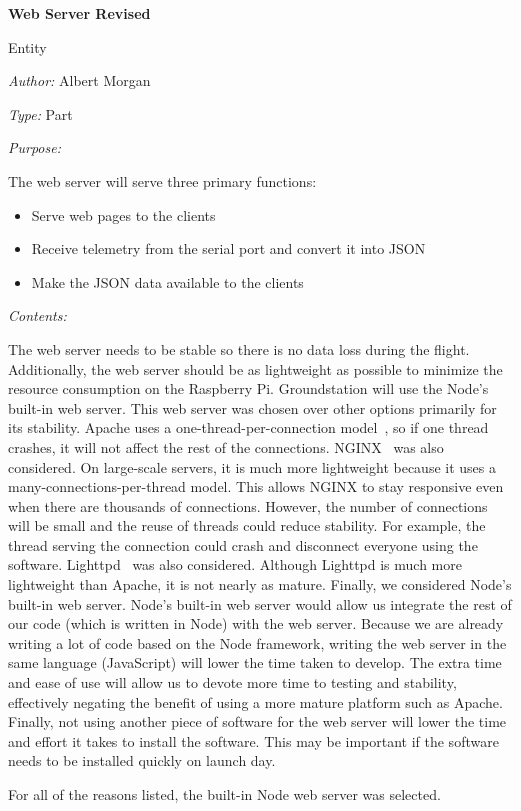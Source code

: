\documentclass[10pt,draftclsnofoot,onecolumn]{IEEEtran}
\newcommand{\newentity}[5]{

	\noindent\textbf{#2}
	
	\noindent Entity
	
	\noindent\textit{Author:} {#1}
		
	\noindent\textit{Type:} {#3}
	
	\noindent\textit{Purpose:} {#4}

	\noindent\textit{Contents:} {#5}
	\vspace{.5cm}

}
\begin{document}
	\newentity
	{Albert Morgan}
	{Web Server Revised}
	{Part}
	{	The web server will serve three primary functions:
		\begin{itemize}
		\item Serve web pages to the clients
		\item Receive telemetry from the serial port and convert it into JSON
		\item Make the JSON data available to the clients
		\end{itemize}
	}
	{
		The web server needs to be stable so there is no data loss during the flight.
		Additionally, the web server should be as lightweight as possible to minimize the resource consumption on the Raspberry Pi.
		Groundstation will use the Node's~\cite{node} built-in web server.
		This web server was chosen over other options primarily for its stability.
		Apache uses a one-thread-per-connection model~\cite{nginx-vs-apache-our-view}, so if one thread crashes, it will not affect the rest of the connections.
		NGINX~\cite{nginx} was also considered. On large-scale servers, it is much more lightweight because it uses a many-connections-per-thread
		model.
		This allows NGINX to stay responsive even when there are thousands of connections.
		However, the number of connections will be small and the reuse of threads could reduce stability.
		For example, the thread serving the connection could crash and disconnect everyone using the software.
		Lighttpd~\cite{lighttpd} was also considered. Although Lighttpd is much more lightweight than Apache,
		it is not nearly as mature.
		Finally, we considered Node's built-in web server.
		Node's built-in web server would allow us integrate the rest of our code (which is written in Node) with the web server.
		Because we are already writing a lot of code based on the Node framework,
		writing the web server in the same language (JavaScript) will lower the time taken to develop.
		The extra time and ease of use will allow us to devote more time to testing and stability,
		effectively negating the benefit of using a more mature platform such as Apache.
		Finally, not using another piece of software for the web server will lower the time and effort it takes to install the software.
		This may be important if the software needs to be installed quickly on launch day.

		For all of the reasons listed, the built-in Node web server was selected.
	}
\end{document}
